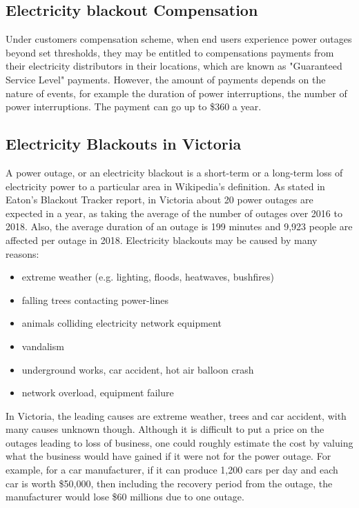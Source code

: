 \documentclass[12pt]{article}
\begin{document}
\subsection{Electricity blackout Compensation}
\begin{flushleft}
Under customers compensation scheme, when end users experience power outages beyond set thresholds, they may be entitled to compensations payments from their electricity distributors in their locations, which are known as "Guaranteed Service Level" payments. However, the amount of payments depends on the nature of events, for example the duration of power interruptions, the number of power interruptions. The payment can go up to \$360 a year.\parencite{cc} \par 
\end{flushleft}

\subsection{Electricity Blackouts in Victoria}
\begin{flushleft}
A power outage, or an electricity blackout is a short-term or a long-term loss of electricity power to a particular area in Wikipedia's definition. As stated in Eaton's Blackout Tracker report, in Victoria about 20 power outages are expected in a year, as taking the average of the number of outages over 2016 to 2018. Also, the average duration of an outage is 199 minutes and 9,923 people are affected per outage in 2018.\parencite{Eaton} Electricity blackouts may be caused by many reasons:
\begin{itemize}
 \item extreme weather (e.g. lighting, floods, heatwaves, bushfires)
 \item falling trees contacting power-lines
 \item animals colliding electricity network equipment
 \item vandalism
 \item underground works, car accident, hot air balloon crash
 \item network overload, equipment failure\parencite{eb2}\parencite{eb1}
\end{itemize}
In Victoria, the leading causes are extreme weather, trees and car accident, with many causes unknown though.\parencite{Eaton} Although it is difficult to put a price on the outages leading to loss of business, one could roughly estimate the cost by valuing what the business would have gained if it were not for the power outage. For example, for a car manufacturer, if it can produce 1,200 cars per day and each car is worth \$50,000, then including the recovery period from the outage, the manufacturer would lose \$60 millions due to one outage.\parencite{MGK} 
\end{flushleft}
\newpage
\end{document}
